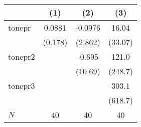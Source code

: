 {
\def\sym#1{\ifmmode^{#1}\else\(^{#1}\)\fi}
\begin{tabular}{l*{3}{c}}
\hline\hline
            &\multicolumn{1}{c}{(1)}         &\multicolumn{1}{c}{(2)}         &\multicolumn{1}{c}{(3)}         \\
\hline
tonepr      &      0.0881         &     -0.0976         &       16.04         \\
            &     (0.178)         &     (2.862)         &     (33.07)         \\
[1em]
tonepr2     &                     &      -0.695         &       121.0         \\
            &                     &     (10.69)         &     (248.7)         \\
[1em]
tonepr3     &                     &                     &       303.1         \\
            &                     &                     &     (618.7)         \\
\hline
\(N\)       &          40         &          40         &          40         \\
\hline\hline
\end{tabular}
}
